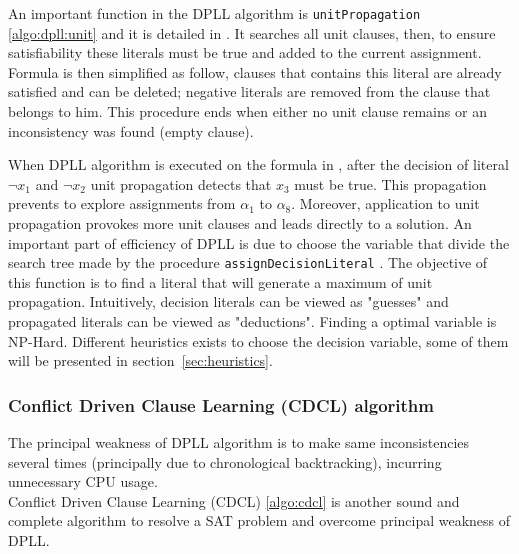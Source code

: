 

An important function in the DPLL algorithm is \texttt{unitPropagation} \cref{algo:dpll:unit} and
it is detailed in . It searches all unit clauses, then, to ensure satisfiability these literals must be true
and added to the current assignment. Formula is then simplified as follow, clauses that contains this literal are already satisfied
and can be deleted; negative literals are removed from the clause that belongs to him.
This procedure ends when either no unit clause remains or an inconsistency was found (empty clause).




When DPLL algorithm is executed on the formula in , after the decision of literal
$\neg x_1$ and $\neg x_2$ unit propagation detects that $x_3$ must be true. This propagation prevents to 
explore assignments from $\alpha_1 $ to $\alpha_{8}$. Moreover, application to unit propagation provokes more unit clauses
and leads directly to a solution. 
An important part of efficiency of DPLL is due to choose the variable that divide the search tree made by
the procedure \texttt{assignDecisionLiteral} . The objective of this function 
is to find a literal that will generate a maximum of unit propagation. Intuitively, decision literals 
can be viewed as "guesses" and propagated literals can be viewed as "deductions". Finding a optimal variable
is NP-Hard. Different heuristics exists to choose the decision variable,
some of them will be presented in section~\ref{sec:heuristics}.


%
%
\subsubsection{Conflict Driven Clause Learning (CDCL) algorithm}\label{sec:cdcl}

The principal weakness of DPLL algorithm is to make same inconsistencies several times
(principally due to chronological backtracking), incurring unnecessary CPU usage.\\
Conflict Driven Clause Learning (CDCL) \cref{algo:cdcl} is another sound and complete algorithm
to resolve a SAT problem and overcome principal weakness of DPLL.


